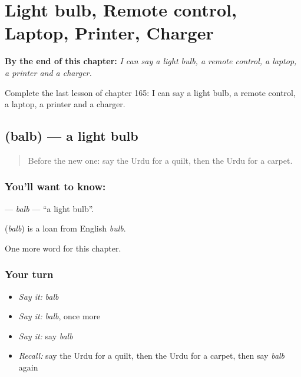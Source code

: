 
\chapter{Light bulb, Remote control, Laptop, Printer, Charger}
\label{ch:ur-light-bulb-remote-control-laptop-printer-charger}

\begin{chapteropening}
\textbf{By the end of this chapter:} \emph{I can say a light bulb, a remote control, a laptop, a printer and a charger.}

Complete the last lesson of chapter 165: I can say a light bulb, a remote control, a laptop, a printer and a charger.
\end{chapteropening}

\section[\texorpdfstring{\ur{بلب} (balb)}{بلب (balb)}]{ (balb) — a light bulb}

\label{lesson:UR-C165-balb}



\begin{quote}
Before the new one: say the Urdu for a quilt, then the Urdu for a carpet.
\end{quote}

\subsection*{You'll want to know: }
\textbf{} — \emph{balb} — \textquotedblleft{}a light bulb\textquotedblright{}.

\begin{cousinweb}
\textbf{} (\emph{balb}) is a loan from English \emph{bulb}.
\end{cousinweb}

\begin{grammarlens}[title={What you've built}]
One more word for this chapter.
\end{grammarlens}

\subsection*{Your turn}
\begin{itemize}
\raggedright
  \item \emph{Say it:} \emph{balb}
  \item \emph{Say it:} \emph{balb}, once more
  \item \emph{Say it:} say \emph{balb}
  \item \emph{Recall:} say the Urdu for a quilt, then the Urdu for a carpet, then say \emph{balb} again
\end{itemize}

